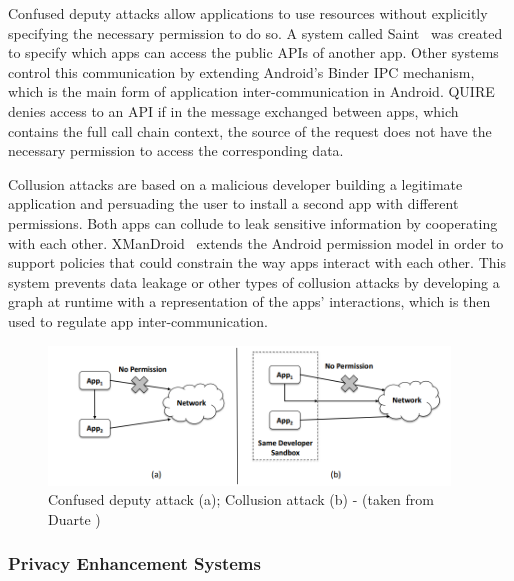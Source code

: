 Confused deputy attacks allow applications to use resources without explicitly specifying the necessary permission to do so. %
A system  called Saint~\cite{ongtang2012semantically} was created to specify which apps can access the public APIs of another app. Other systems control this communication by extending Android’s Binder \ac{IPC} mechanism, which is the main form of application inter-communication in Android. QUIRE~\cite{dietz2011quire} denies access to an API if in the message exchanged between apps, which contains the full call chain context, the source of the request does not have the necessary permission to access the corresponding data.

Collusion attacks are based on a malicious developer building a legitimate application and persuading the user to install a second app with different permissions. Both apps can collude to leak sensitive information by cooperating with each other. XManDroid~\cite{bugiel2011xmandroid} extends the Android permission model in order to support policies that could constrain the way apps interact with each other. This system prevents data leakage or other types of collusion attacks by developing a graph at runtime with a representation of the apps’ interactions, which is then used to regulate app inter-communication.

\begin{figure}[t!]
	\centering
	\includegraphics[width=0.95\textwidth]{img/communicationattacks.png}
	\caption{Confused deputy attack (a); Collusion attack (b) - (taken from Duarte \cite{nunoduarte})}
	\label{fig:communicationattacks}
\end{figure}

\subsubsection{Privacy Enhancement Systems}

